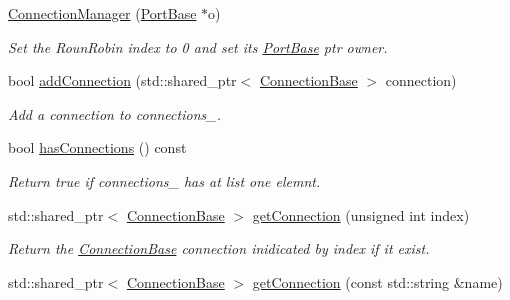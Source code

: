 \begin{DoxyCompactItemize}
\item 
\hypertarget{classcoco_1_1_connection_manager_acc77c57271baa8de5d3b20a10497a55d}{}\hyperlink{classcoco_1_1_connection_manager_acc77c57271baa8de5d3b20a10497a55d}{Connection\+Manager} (\hyperlink{classcoco_1_1_port_base}{Port\+Base} $\ast$o)\label{classcoco_1_1_connection_manager_acc77c57271baa8de5d3b20a10497a55d}

\begin{DoxyCompactList}\small\item\em Set the Roun\+Robin index to 0 and set its \hyperlink{classcoco_1_1_port_base}{Port\+Base} ptr owner. \end{DoxyCompactList}\item 
\hypertarget{classcoco_1_1_connection_manager_acc1eea2a62f85fb48aa3d7bce1e7e272}{}bool \hyperlink{classcoco_1_1_connection_manager_acc1eea2a62f85fb48aa3d7bce1e7e272}{add\+Connection} (std\+::shared\+\_\+ptr$<$ \hyperlink{classcoco_1_1_connection_base}{Connection\+Base} $>$ connection)\label{classcoco_1_1_connection_manager_acc1eea2a62f85fb48aa3d7bce1e7e272}

\begin{DoxyCompactList}\small\item\em Add a connection to {\ttfamily connections\+\_\+}. \end{DoxyCompactList}\item 
\hypertarget{classcoco_1_1_connection_manager_a81502d9aeb59d1c0b74d69e598f38d2b}{}bool \hyperlink{classcoco_1_1_connection_manager_a81502d9aeb59d1c0b74d69e598f38d2b}{has\+Connections} () const \label{classcoco_1_1_connection_manager_a81502d9aeb59d1c0b74d69e598f38d2b}

\begin{DoxyCompactList}\small\item\em Return true if {\ttfamily connections\+\_\+} has at list one elemnt. \end{DoxyCompactList}\item 
\hypertarget{classcoco_1_1_connection_manager_aa23256ee02cbaad69979e5ceac6523f5}{}std\+::shared\+\_\+ptr$<$ \hyperlink{classcoco_1_1_connection_base}{Connection\+Base} $>$ \hyperlink{classcoco_1_1_connection_manager_aa23256ee02cbaad69979e5ceac6523f5}{get\+Connection} (unsigned int index)\label{classcoco_1_1_connection_manager_aa23256ee02cbaad69979e5ceac6523f5}

\begin{DoxyCompactList}\small\item\em Return the \hyperlink{classcoco_1_1_connection_base}{Connection\+Base} connection inidicated by index if it exist. \end{DoxyCompactList}\item 
\hypertarget{classcoco_1_1_connection_manager_a2f3e6c3cd5c5df4716c37e7f66712a59}{}std\+::shared\+\_\+ptr$<$ \hyperlink{classcoco_1_1_connection_base}{Connection\+Base} $>$ \hyperlink{classcoco_1_1_connection_manager_a2f3e6c3cd5c5df4716c37e7f66712a59}{get\+Connection} (const std\+::string \&name)\label{classcoco_1_1_connection_manager_a2f3e6c3cd5c5df4716c37e7f66712a59}


\end{DoxyCompactItemize}
